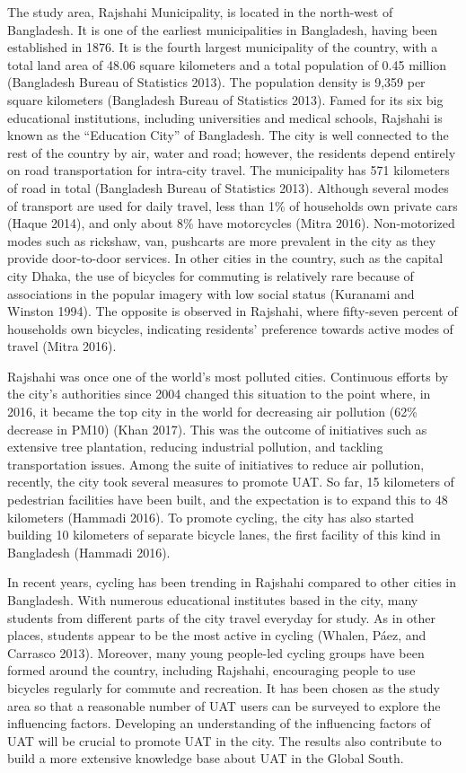 \documentclass[]{elsarticle} %
\begin{document}
The study area, Rajshahi Municipality, is located in the north-west of
Bangladesh. It is one of the earliest municipalities in Bangladesh,
having been established in 1876. It is the fourth largest municipality
of the country, with a total land area of 48.06 square kilometers and a
total population of 0.45 million (Bangladesh Bureau of Statistics 2013).
The population density is 9,359 per square kilometers (Bangladesh Bureau
of Statistics 2013). Famed for its six big educational institutions,
including universities and medical schools, Rajshahi is known as the
``Education City'' of Bangladesh. The city is well connected to the rest
of the country by air, water and road; however, the residents depend
entirely on road transportation for intra-city travel. The municipality
has 571 kilometers of road in total (Bangladesh Bureau of Statistics
2013). Although several modes of transport are used for daily travel,
less than 1\% of households own private cars (Haque 2014), and only
about 8\% have motorcycles (Mitra 2016). Non-motorized modes such as
rickshaw, van, pushcarts are more prevalent in the city as they provide
door-to-door services. In other cities in the country, such as the
capital city Dhaka, the use of bicycles for commuting is relatively rare
because of associations in the popular imagery with low social status
(Kuranami and Winston 1994). The opposite is observed in Rajshahi, where
fifty-seven percent of households own bicycles, indicating residents'
preference towards active modes of travel (Mitra 2016).

Rajshahi was once one of the world's most polluted cities. Continuous
efforts by the city's authorities since 2004 changed this situation to
the point where, in 2016, it became the top city in the world for
decreasing air pollution (62\% decrease in PM10) (Khan 2017). This was
the outcome of initiatives such as extensive tree plantation, reducing
industrial pollution, and tackling transportation issues. Among the
suite of initiatives to reduce air pollution, recently, the city took
several measures to promote UAT. So far, 15 kilometers of pedestrian
facilities have been built, and the expectation is to expand this to 48
kilometers (Hammadi 2016). To promote cycling, the city has also started
building 10 kilometers of separate bicycle lanes, the first facility of
this kind in Bangladesh (Hammadi 2016).

In recent years, cycling has been trending in Rajshahi compared to other
cities in Bangladesh. With numerous educational institutes based in the
city, many students from different parts of the city travel everyday for
study. As in other places, students appear to be the most active in
cycling (Whalen, Páez, and Carrasco 2013). Moreover, many young
people-led cycling groups have been formed around the country, including
Rajshahi, encouraging people to use bicycles regularly for commute and
recreation. It has been chosen as the study area so that a reasonable
number of UAT users can be surveyed to explore the influencing factors.
Developing an understanding of the influencing factors of UAT will be
crucial to promote UAT in the city. The results also contribute to build
a more extensive knowledge base about UAT in the Global South.
\end{document}
